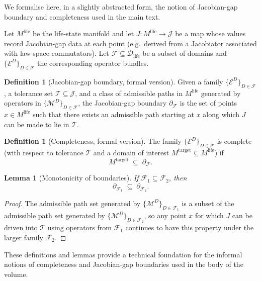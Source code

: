 \documentclass[11pt]{book}
\theoremstyle{plain}
\newtheorem{lemma}[theorem]{Lemma}
\theoremstyle{definition}
\newtheorem{definition}[theorem]{Definition}
\theoremstyle{remark}
\begin{document}
We formalise here, in a slightly abstracted form, the notion of
Jacobian-gap boundary and completeness used in the main text.

Let $M^{\mathrm{life}}$ be the life-state manifold and let
$J \colon M^{\mathrm{life}} \to \mathcal{J}$ be a map whose values
record Jacobian-gap data at each point (e.g.\ derived from a
Jacobiator associated with law-space commutators). Let
$\mathcal{F} \subseteq \mathcal{D}_{\mathrm{life}}$ be a subset of
domains and $\{\mathcal{E}^{D}\}_{D \in \mathcal{F}}$ the corresponding
operator bundles.

\begin{definition}[Jacobian-gap boundary, formal version]
Given a family $\{\mathcal{E}^{D}\}_{D \in \mathcal{F}}$, a tolerance
set $\mathcal{T} \subseteq \mathcal{J}$, and a class of admissible
paths in $M^{\mathrm{life}}$ generated by operators in
$\{\mathcal{M}^{D}\}_{D \in \mathcal{F}}$, the Jacobian-gap boundary
$\partial_{\mathcal{F}}$ is the set of points $x \in M^{\mathrm{life}}$
such that there exists an admissible path starting at $x$ along which
$J$ can be made to lie in $\mathcal{T}$.
\end{definition}

\begin{definition}[Completeness, formal version]
The family $\{\mathcal{E}^{D}\}_{D \in \mathcal{F}}$ is complete
(with respect to tolerance $\mathcal{T}$ and a domain of interest
$M^{\mathrm{target}} \subseteq M^{\mathrm{life}}$) if
\[
  M^{\mathrm{target}}
  \;\subseteq\;
  \partial_{\mathcal{F}}.
\]
\end{definition}

\begin{lemma}[Monotonicity of boundaries]
If $\mathcal{F}_{1} \subseteq \mathcal{F}_{2}$, then
\[
  \partial_{\mathcal{F}_{1}}
  \;\subseteq\;
  \partial_{\mathcal{F}_{2}}.
\]
\end{lemma}

\begin{proof}
The admissible path set generated by
$\{\mathcal{M}^{D}\}_{D \in \mathcal{F}_{1}}$ is a subset of the
admissible path set generated by
$\{\mathcal{M}^{D}\}_{D \in \mathcal{F}_{2}}$, so any point $x$ for
which $J$ can be driven into $\mathcal{T}$ using operators from
$\mathcal{F}_{1}$ continues to have this property under the larger
family $\mathcal{F}_{2}$.
\end{proof}

These definitions and lemmas provide a technical foundation for the
informal notions of completeness and Jacobian-gap boundaries used in
the body of the volume.
\end{document}
